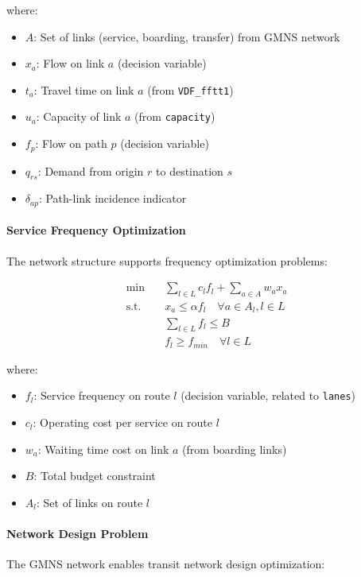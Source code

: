 \documentclass[11pt,a4paper]{article}
\begin{document}
where:
\begin{itemize}
    \item $A$: Set of links (service, boarding, transfer) from GMNS network
    \item $x_a$: Flow on link $a$ (decision variable)
    \item $t_a$: Travel time on link $a$ (from \texttt{VDF\_fftt1})
    \item $u_a$: Capacity of link $a$ (from \texttt{capacity})
    \item $f_p$: Flow on path $p$ (decision variable)
    \item $q_{rs}$: Demand from origin $r$ to destination $s$
    \item $\delta_{ap}$: Path-link incidence indicator
\end{itemize}

\paragraph{Service Frequency Optimization}
The network structure supports frequency optimization problems:

\begin{align}
\min \quad & \sum_{l \in L} c_l f_l + \sum_{a \in A} w_a x_a \\
\text{s.t.} \quad & x_a \leq \alpha f_l \quad \forall a \in A_l, l \in L \\
& \sum_{l \in L} f_l \leq B \\
& f_l \geq f_{min} \quad \forall l \in L
\end{align}

where:
\begin{itemize}
    \item $f_l$: Service frequency on route $l$ (decision variable, related to \texttt{lanes})
    \item $c_l$: Operating cost per service on route $l$
    \item $w_a$: Waiting time cost on link $a$ (from boarding links)
    \item $B$: Total budget constraint
    \item $A_l$: Set of links on route $l$
\end{itemize}

\paragraph{Network Design Problem}
The GMNS network enables transit network design optimization:
\end{document}
